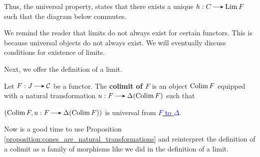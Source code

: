 \begin{definition}[Limits]
\begin{itemize}
            Thus, the universal property, states that there exists a unique $h: C \to \Lim F$ such that the diagram 
            below commutes. 
            \begin{center}
            \end{center}
        \end{itemize}
    \end{definition}

    \begin{remark}
        We remind the reader that limits do not always exist for certain functors. 
        This is because universal objects do not always exist. We will eventually discuss 
        conditions for existence of limits.
    \end{remark}
    
    Next, we offer the definition of a limit. 

    \begin{definition}[Colimits]\label{definition:colimit_of_a_functor}
        Let $F: J \to \cc$ be a functor. The \textbf{colimit of $F$} is an object 
        $\operatorname*{\mathrm{Colim }} F$ equipped with a natural transformation $u: F \to \Delta(\Colim F)$ 
        such that 
        \begin{center}
            $(\Colim F, u: F \to \Delta(\Colim F))$ is universal from 
            \hyperref[definition:universal_morphism_from_D_to_F]{\textcolor{blue}{$F$ to $\Delta$}}.
        \end{center}
    \end{definition}
    
    Now is a good time to use Proposition \ref{proposition:cones_are_natural_transformations} 
    and reinterpret the definition of a colimit as a family of morphisms 
    like we did in the definition of a limit.

